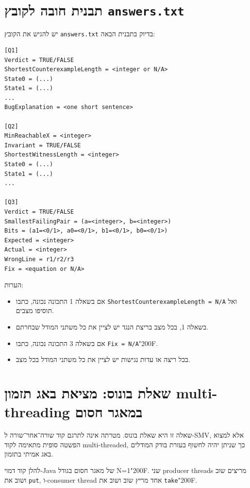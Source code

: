 \documentclass[11pt,a4paper]{article}
\newcommand{\RLM}{\char"200F}
\newenvironment{englishlisting}
  {\begin{english}\begin{flushleft}}
  {\end{flushleft}\end{english}}
\begin{document}
\section{תבנית חובה לקובץ \texttt{answers.txt}}
יש להגיש את הקובץ \texttt{answers.txt} בדיוק בתבנית הבאה:

\begin{englishlisting}
\begin{lstlisting}
[Q1]
Verdict = TRUE/FALSE
ShortestCounterexampleLength = <integer or N/A>
State0 = (...)
State1 = (...)
...
BugExplanation = <one short sentence>

[Q2]
MinReachableX = <integer>
Invariant = TRUE/FALSE
ShortestWitnessLength = <integer>
State0 = (...)
State1 = (...)
...

[Q3]
Verdict = TRUE/FALSE
SmallestFailingPair = (a=<integer>, b=<integer>)
Bits = (a1=<0/1>, a0=<0/1>, b1=<0/1>, b0=<0/1>)
Expected = <integer>
Actual = <integer>
WrongLine = r1/r2/r3
Fix = <equation or N/A>
\end{lstlisting}
\end{englishlisting}

\noindent
הערות:
\begin{itemize}
  \item אם בשאלה 1 התכונה נכונה, כתבו \texttt{ShortestCounterexampleLength = N/A} ואל תוסיפו מצבים.
  \item בשאלה 1, בכל מצב בריצת הנגד יש לציין את כל משתני המודל שבחרתם.
  \item אם בשאלה 3 התכונה נכונה, כתבו \texttt{Fix = N/A}\RLM.
  \item בכל ריצה או עדות נגישות יש לציין את כל משתני המודל בכל מצב.
\end{itemize}

\clearpage
\section{שאלת בונוס: מציאת באג תזמון multi-threading במאגר חסום}
שאלה זו היא שאלת בונוס. מטרתה אינה לתרגם קוד שורה־אחר־שורה ל-\textenglish{SMV}, אלא למצוא הפשטה סופית מתאימה לקוד \textenglish{multi-threaded}, כך שניתן יהיה לחשוף בעזרת בודק המודלים באג אמיתי בתזמון.

להלן קוד דמוי-\textenglish{Java} של מאגר חסום בגודל \textenglish{N=1}\RLM. שני \textenglish{producer threads} מריצים שוב ושוב את \texttt{put}, ו-\textenglish{consumer thread} אחד מריץ שוב ושוב את \texttt{take}\RLM.
\end{document}
